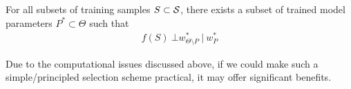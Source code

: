 \begin{assumption}\label{assum:sub}
For all subsets of training samples $S \subset \mathcal{S}$, there exists a subset of trained model parameters $P^* \subset \Theta$ such that
\begin{align}\label{eq:assum}
    f(S)\ \bot w_{\Theta\setminus P}^*\ |\ w_{P}^*
\end{align}
\end{assumption}
Due to the computational issues discussed above, 
if we could make such a simple/principled selection scheme practical, it may offer significant 
benefits.




